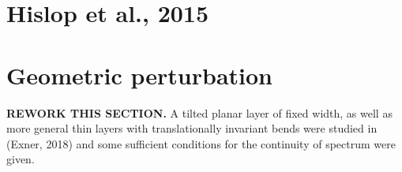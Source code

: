 \section{Hislop et al., 2015}
\cite{Hislop2015}




\section{Geometric perturbation}
\textbf{REWORK THIS SECTION.} A tilted planar layer of fixed width, as well as more general thin layers with translationally invariant bends were studied in (Exner, 2018) and some sufficient conditions for the continuity of spectrum were given.

